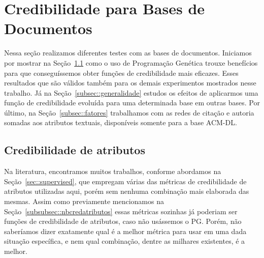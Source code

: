 
\section{Credibilidade para Bases de Documentos}
\label{sec::documentos}

Nessa seção realizamos diferentes testes com as bases de documentos.
Iniciamos por mostrar na Seção~\ref{subsec::ganhosgp} como o uso de Programação Genética trouxe benefícios para que conseguíssemos obter funções de credibilidade mais eficazes. Esses
resultados que são válidos também para os demais experimentos mostrados nesse trabalho.
Já na Seção~\ref{subsec::generalidade} estudos os efeitos de aplicarmos uma função de credibilidade evoluída para uma determinada base em outras bases.
Por último, na Seção~\ref{subsec::fatores} trabalhamos com as redes de citação e autoria somadas aos atributos textuais, disponíveis somente para a base \textsc{ACM-DL}.

\subsection{Credibilidade de atributos}
\label{subsec::ganhosgp}

Na literatura, encontramos muitos trabalhos, conforme abordamos na Seção~\ref{sec::supervised}, que empregam várias das métricas de credibilidade de atributos utilizadas aqui, porém sem nenhuma combinação mais elaborada das mesmas.
Assim como previamente mencionamos na Seção~\ref{subsubsec::nbcredatributos} essas métricas sozinhas já poderiam ser funções de credibilidade de atributos, caso não usássemos o \textsc{PG}. Porém, não saberíamos dizer exatamente qual é a melhor métrica para usar em uma dada situação específica, e nem qual combinação, dentre as milhares existentes, é a melhor.

